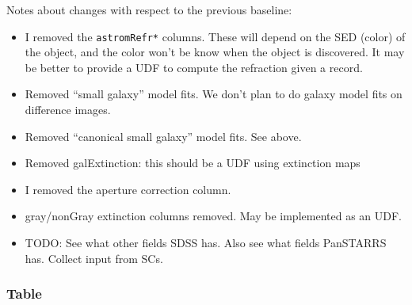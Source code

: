 \begin{changelog}
Notes about changes with respect to the previous baseline:
\begin{itemize}
    \item I removed the \texttt{astromRefr*} columns. These will depend on the SED (color) of the object, and the color won't be know when the object is discovered. It may be better to provide a UDF to compute the refraction given a \DIAObject record.
    \item Removed ``small galaxy'' model fits. We don't plan to do galaxy model fits on difference images.
    \item Removed ``canonical small galaxy'' model fits. See above.
    \item Removed galExtinction: this should be a UDF using extinction maps
    \item I removed the aperture correction column.
    \item gray/nonGray extinction columns removed. May be implemented as an UDF.
    \item TODO: See what other fields SDSS has. Also see what fields PanSTARRS has. Collect input from SCs.
\end{itemize}
\end{changelog}

\subsubsection{\DIAObject Table}


